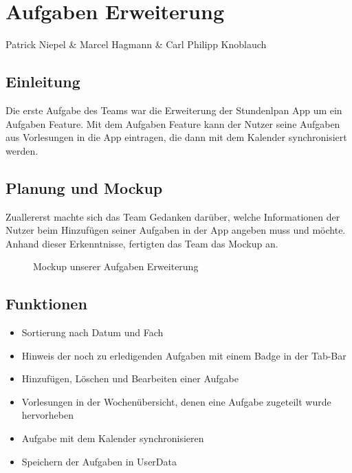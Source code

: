 \chapter{Aufgaben Erweiterung}
Patrick Niepel \& Marcel Hagmann \& Carl Philipp Knoblauch

\section{Einleitung}
Die erste Aufgabe des Teams war die Erweiterung der Stundenlpan App um ein Aufgaben Feature. Mit dem Aufgaben Feature kann der Nutzer seine Aufgaben aus Vorlesungen in die App eintragen, die dann mit dem Kalender synchronisiert werden.

\newpage
\section{Planung und Mockup}

Zuallererst machte sich das Team Gedanken darüber, welche Informationen der Nutzer beim Hinzufügen seiner Aufgaben in der App angeben muss und möchte. Anhand dieser Erkenntnisse, fertigten das Team das Mockup an.


\begin{figure}[ht]
	\centering
	\caption{Mockup unserer Aufgaben Erweiterung}
	\label{fig1}
\end{figure}

\newpage
\section{Funktionen}
\begin{itemize}
\item Sortierung nach Datum und Fach
\item Hinweis der noch zu erledigenden Aufgaben mit einem Badge in der Tab-Bar
\item Hinzufügen, Löschen und Bearbeiten einer Aufgabe
\item Vorlesungen in der Wochenübersicht, denen eine Aufgabe zugeteilt wurde hervorheben
\item Aufgabe mit dem Kalender synchronisieren
\item Speichern der Aufgaben in UserData
\end{itemize}


